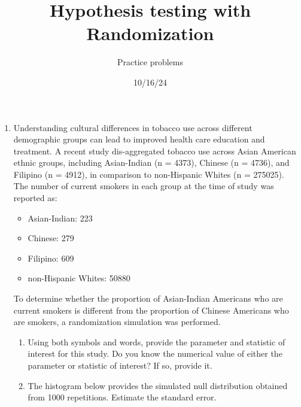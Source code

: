 \documentclass[
  letterpaper,
  DIV=11,
  numbers=noendperiod]{scrartcl}
\title{Hypothesis testing with Randomization}
\author{Practice problems}
\date{10/16/24}
\begin{document}
\maketitle
\ifdefined\Shaded\renewenvironment{Shaded}{\begin{tcolorbox}[interior hidden, breakable, enhanced, borderline west={3pt}{0pt}{shadecolor}, boxrule=0pt, sharp corners, frame hidden]}{\end{tcolorbox}}\fi

\begin{enumerate}
\def\labelenumi{\arabic{enumi}.}
\item
  Understanding cultural differences in tobacco use across different
  demographic groups can lead to improved health care education and
  treatment. A recent study dis-aggregated tobacco use across Asian
  American ethnic groups, including Asian-Indian (n = 4373), Chinese (n
  = 4736), and Filipino (n = 4912), in comparison to non-Hispanic Whites
  (n = 275025). The number of current smokers in each group at the time
  of study was reported as:

  \begin{itemize}
  \item
    Asian-Indian: 223
  \item
    Chinese: 279
  \item
    Filipino: 609
  \item
    non-Hispanic Whites: 50880
  \end{itemize}

  To determine whether the proportion of Asian-Indian Americans who are
  current smokers is different from the proportion of Chinese Americans
  who are smokers, a randomization simulation was performed.

  \begin{enumerate}
  \def\labelenumii{\alph{enumii}.}
  \item
    Using both symbols and words, provide the parameter and statistic of
    interest for this study. Do you know the numerical value of either
    the parameter or statistic of interest? If so, provide it.
  \item
    The histogram below provides the simulated null distribution
    obtained from 1000 repetitions. Estimate the standard error.


\end{enumerate}
\end{enumerate}
\end{document}
